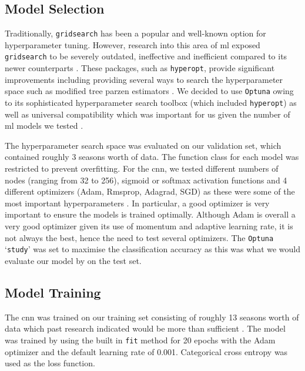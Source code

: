 \documentclass{article}
\newcommand{\sw}[1]{\texttt{#1}}
\begin{document}
\subsection{Model Selection}
\label{modelselection}

Traditionally, \sw{gridsearch} has been a popular and well-known option for hyperparameter tuning. However, research into this area of \gls{ml} exposed \sw{gridsearch} to be severely outdated, ineffective and inefficient compared to its newer counterparts \cite{hyperparamreview}. These packages, such as \sw{hyperopt}, provide significant improvements including providing several ways to search the hyperparameter space such as modified tree parzen estimators \cite{hyperopt}. We decided to use \sw{Optuna} owing to its sophisticated hyperparameter search toolbox (which included \sw{hyperopt}) as well as universal compatibility which was important for us given the number of \gls{ml} models we tested \cite{optuna}.  

The hyperparameter search space was evaluated on our validation set, which contained roughly 3 seasons worth of data. The function class for each model was restricted to prevent overfitting. For the \gls{cnn}, we tested different numbers of nodes (ranging from 32 to 256), sigmoid or softmax activation functions and 4 different optimizers (Adam, Rmsprop, Adagrad, SGD) as these were some of the most important hyperparameters \cite{laumediumCNNtuning}. In particular, a good optimizer is very important to ensure the models is trained optimally. Although Adam is overall a very good optimizer given its use of momentum and adaptive learning rate, it is not always the best, hence the need to test several optimizers. The \sw{Optuna} ‘\sw{study}’ was set to maximise the classification accuracy as this was what we would evaluate our model by on the test set. 

\subsection{Model Training}
\label{modeltraining}

\vspace{-0.5em}
The \gls{cnn} was trained on our training set consisting of roughly 13 seasons worth of data which past research indicated would be more than sufficient \cite{horvat2020use}. The model was trained by using the built in \sw{fit} method for 20 epochs with the Adam optimizer and the default learning rate of 0.001. Categorical cross entropy was used as the loss function.
\end{document}
